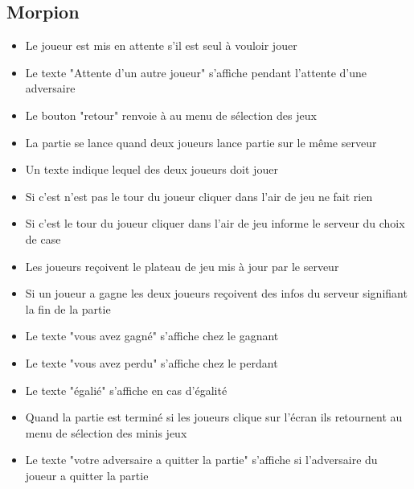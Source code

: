 \documentclass{report}
\begin{document}
\subsection{Morpion}
\begin{itemize}
  \item Le joueur est mis en attente s'il est seul à vouloir jouer
  \item Le texte "Attente d'un autre joueur" s'affiche pendant l'attente d'une adversaire
  \item Le bouton "retour" renvoie à au menu de sélection des jeux
  \item La partie se lance quand deux joueurs lance partie sur le même serveur
  \item Un texte indique lequel des deux joueurs doit jouer
  \item Si c'est n'est pas le tour du joueur cliquer dans l'air de jeu ne fait rien
  \item Si c'est le tour du joueur cliquer dans l'air de jeu informe le serveur du choix de case
  \item Les joueurs reçoivent le plateau de jeu mis à jour par le serveur
  \item Si un joueur a gagne les deux joueurs reçoivent des infos du serveur signifiant la fin de la partie
  \item Le texte "vous avez gagné" s'affiche chez le gagnant
  \item Le texte "vous avez perdu" s'affiche chez le perdant
  \item Le texte "égalié" s'affiche en cas d'égalité
  \item Quand la partie est terminé si les joueurs clique sur l'écran ils retournent au menu de sélection des minis jeux
  \item Le texte "votre adversaire a quitter la partie" s'affiche si l'adversaire du joueur a quitter la partie
\end{itemize}
\end{document}
